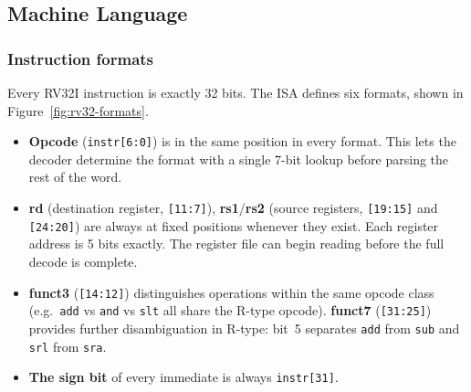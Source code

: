 \documentclass[9pt, a4paper]{extarticle}
\begin{document}
\subsection{Machine Language}
  
\subsubsection{Instruction formats}

Every RV32I instruction is exactly 32 bits. The ISA defines six formats, shown in Figure~\ref{fig:rv32-formats}.

\begin{itemize}
    \item \textbf{Opcode} (\texttt{instr[6:0]}) is in the same position in every format. This lets the decoder determine the format with a single 7-bit lookup before parsing the rest of the word.
    \item \textbf{rd} (destination register, \texttt{[11:7]}), \textbf{rs1}/\textbf{rs2} (source registers, \texttt{[19:15]} and \texttt{[24:20]}) are always at fixed positions whenever they exist. Each register address is 5 bits exactly. The register file can begin reading before the full decode is complete.
    \item \textbf{funct3} (\texttt{[14:12]}) distinguishes operations within the same opcode class (e.g.\ \texttt{add} vs \texttt{and} vs \texttt{slt} all share the R-type opcode). \textbf{funct7} (\texttt{[31:25]}) provides further disambiguation in R-type: bit~5 separates \texttt{add} from \texttt{sub} and \texttt{srl} from \texttt{sra}.
    \item \textbf{The sign bit} of every immediate is always \texttt{instr[31]}.
\end{itemize}
\end{document}
